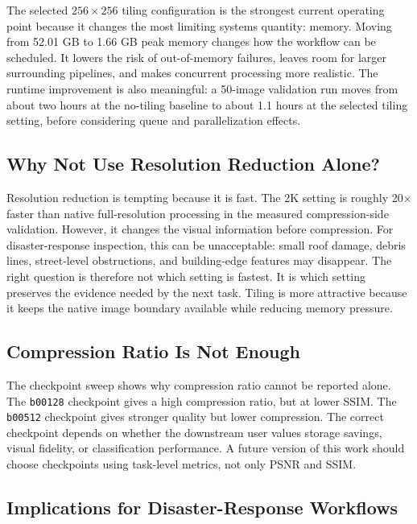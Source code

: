 \documentclass[conference]{IEEEtran}
\begin{document}
The selected $256 \times 256$ tiling configuration is the strongest current operating point because it changes the most limiting systems quantity: memory. Moving from 52.01 GB to 1.66 GB peak memory changes how the workflow can be scheduled. It lowers the risk of out-of-memory failures, leaves room for larger surrounding pipelines, and makes concurrent processing more realistic. The runtime improvement is also meaningful: a 50-image validation run moves from about two hours at the no-tiling baseline to about 1.1 hours at the selected tiling setting, before considering queue and parallelization effects.

\subsection{Why Not Use Resolution Reduction Alone?}

Resolution reduction is tempting because it is fast. The 2K setting is roughly 20$\times$ faster than native full-resolution processing in the measured compression-side validation. However, it changes the visual information before compression. For disaster-response inspection, this can be unacceptable: small roof damage, debris lines, street-level obstructions, and building-edge features may disappear. The right question is therefore not which setting is fastest. It is which setting preserves the evidence needed by the next task. Tiling is more attractive because it keeps the native image boundary available while reducing memory pressure.

\subsection{Compression Ratio Is Not Enough}

The checkpoint sweep shows why compression ratio cannot be reported alone. The \texttt{b00128} checkpoint gives a high compression ratio, but at lower SSIM. The \texttt{b00512} checkpoint gives stronger quality but lower compression. The correct checkpoint depends on whether the downstream user values storage savings, visual fidelity, or classification performance. A future version of this work should choose checkpoints using task-level metrics, not only PSNR and SSIM.

\subsection{Implications for Disaster-Response Workflows}
\end{document}
